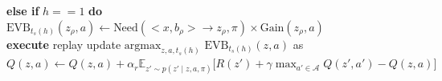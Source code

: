 \documentclass{article}
\begin{document}
\hspace*{0.5cm} \hspace*{0.5cm} \hspace*{0.5cm} \hspace*{0.5cm} \hspace*{0.5cm} \textbf{else if} $h == 1$ \textbf{do}\\
\hspace*{0.5cm} \hspace*{0.5cm} \hspace*{0.5cm} \hspace*{0.5cm} \hspace*{0.5cm} \hspace*{0.5cm} $\text{EVB}_{t_{s}(h)}(z_{\rho}, a) \leftarrow \text{Need}(<x, b_{\rho}> \rightarrow z_{\rho}, \pi) \times \text{Gain}(z_{\rho}, a)$\\
\hspace*{0.5cm} \textbf{execute} replay update $\text{argmax}_{z, a, t_{s}(h)} \, \, \text{EVB}_{t_{s}(h)}(z, a)$ as\\
\hspace*{0.5cm} \hspace*{0.5cm} $Q(z, a) \leftarrow Q(z, a) + \alpha_r \mathbb{E}_{z'\sim p(z'\mid z, a, \pi)}\big[R(z') + \gamma \max_{a' \in \mathcal{A}}Q(z', a') - Q(z, a)\big]$
\end{document}
